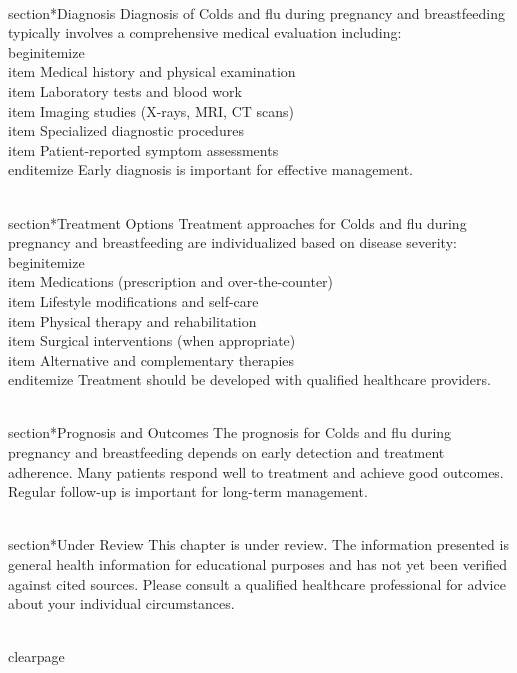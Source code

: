 \\section*{Diagnosis}
Diagnosis of Colds and flu during pregnancy and breastfeeding typically involves a comprehensive medical evaluation including:
\\begin{itemize}
  \\item Medical history and physical examination
  \\item Laboratory tests and blood work
  \\item Imaging studies (X-rays, MRI, CT scans)
  \\item Specialized diagnostic procedures
  \\item Patient-reported symptom assessments
\\end{itemize}
Early diagnosis is important for effective management.

\\section*{Treatment Options}
Treatment approaches for Colds and flu during pregnancy and breastfeeding are individualized based on disease severity:
\\begin{itemize}
  \\item Medications (prescription and over-the-counter)
  \\item Lifestyle modifications and self-care
  \\item Physical therapy and rehabilitation
  \\item Surgical interventions (when appropriate)
  \\item Alternative and complementary therapies
\\end{itemize}
Treatment should be developed with qualified healthcare providers.

\\section*{Prognosis and Outcomes}
The prognosis for Colds and flu during pregnancy and breastfeeding depends on early detection and treatment adherence. Many patients respond well to treatment and achieve good outcomes. Regular follow-up is important for long-term management.

\\section*{Under Review}
This chapter is under review. The information presented is general health information for educational purposes and has not yet been verified against cited sources. Please consult a qualified healthcare professional for advice about your individual circumstances.

\\clearpage
